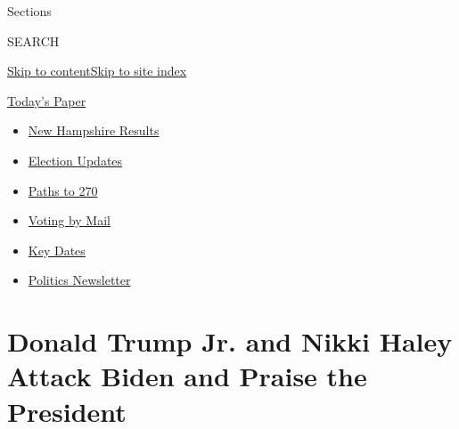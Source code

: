 Sections

SEARCH

\protect\hyperlink{site-content}{Skip to
content}\protect\hyperlink{site-index}{Skip to site index}

\href{https://myaccount.nytimes3xbfgragh.onion/auth/login?response_type=cookie\&client_id=vi}{}

\href{https://www.nytimes3xbfgragh.onion/section/todayspaper}{Today's
Paper}

\begin{itemize}
\item
  \href{https://www.nytimes3xbfgragh.onion/interactive/2020/09/08/us/elections/results-new-hampshire-primary-elections.html?action=click\&pgtype=Article\&state=default\&region=TOP_BANNER\&context=storylines_menu}{New
  Hampshire Results}
\item
  \href{https://www.nytimes3xbfgragh.onion/live/2020/09/08/us/trump-vs-biden?action=click\&pgtype=Article\&state=default\&region=TOP_BANNER\&context=storylines_menu}{Election
  Updates}
\item
  \href{https://www.nytimes3xbfgragh.onion/interactive/2020/us/elections/election-states-biden-trump.html?action=click\&pgtype=Article\&state=default\&region=TOP_BANNER\&context=storylines_menu}{Paths
  to 270}
\item
  \href{https://www.nytimes3xbfgragh.onion/interactive/2020/08/31/us/politics/vote-by-mail-deadlines.html?action=click\&pgtype=Article\&state=default\&region=TOP_BANNER\&context=storylines_menu}{Voting
  by Mail}
\item
  \href{https://www.nytimes3xbfgragh.onion/interactive/2019/us/elections/2020-presidential-election-calendar.html?action=click\&pgtype=Article\&state=default\&region=TOP_BANNER\&context=storylines_menu}{Key
  Dates}
\item
  \href{https://www.nytimes3xbfgragh.onion/newsletters/politics?action=click\&pgtype=Article\&state=default\&region=TOP_BANNER\&context=storylines_menu}{Politics
  Newsletter}
\end{itemize}

\hypertarget{donald-trump-jr-and-nikki-haley-attack-biden-and-praise-the-president}{%
\section{Donald Trump Jr. and Nikki Haley Attack Biden and Praise the
President}\label{donald-trump-jr-and-nikki-haley-attack-biden-and-praise-the-president}}

